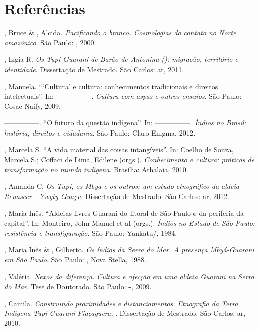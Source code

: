 \section{Referências}

\begin{Parskip}
, Bruce \& , Alcida. \emph{Pacificando o branco. Cosmologias do
contato no Norte amazônico}. São Paulo: , 2000.

, Lígia R. \emph{Os Tupi Guarani de Barão de Antonina (): migração,
território e identidade}. Dissertação de Mestrado. São Carlos: ar,
2011.

  , Manuela. ``‘Cultura’ e cultura: conhecimentos
tradicionais e direitos intelectuais''. In: —————. \emph{Cultura com aspas e outros
ensaios}. São Paulo: Cosac Naify, 2009. 

—————. ``O futuro da questão indígena''. In: —————. \emph{Índios no Brasil: história,
direitos e cidadania}. São Paulo: Claro Enigma, 2012.

  , Marcela S. ``A vida material das coisas intangíveis''.
In: Coelho de Souza, Marcela S.; Coffaci de Lima, Edilene (orgs.).
\emph{Conhecimento e cultura: práticas de transformação no mundo indígena}.
Brasília: Athalaia, 2010.

, Amanda C. \emph{Os Tupi, os Mbya e os outros: um estudo etnográfico da
aldeia Renascer - Ywyty Guaçu}. Dissertação de Mestrado. São Carlos:
ar, 2012. 

, Maria Inês. ``Aldeias livres Guarani do litoral de São Paulo e
da periferia da capital''. In: Monteiro, John Manuel et al (orgs.).
\emph{Índios no Estado de São Paulo: resistência e transfiguração}. São Paulo:
Yankatu/, 1984.

, Maria Inês \& , Gilberto. \emph{Os índios da Serra do Mar. A
presença Mbyá-Guarani em São Paulo}. São Paulo: , Nova Stella, 1988.

, Valéria. \emph{Nexos da diferença. Cultura e afecção em uma aldeia
Guarani na Serra do Mar}. Tese de Doutorado.  São Paulo: -,
2009.

, Camila. \emph{Construindo proximidades e distanciamentos. Etnografia
da Terra Indígena Tupi Guarani Piaçaguera, }. Dissertação de Mestrado.
São Carlos: ar, 2010.


\end{Parskip}
